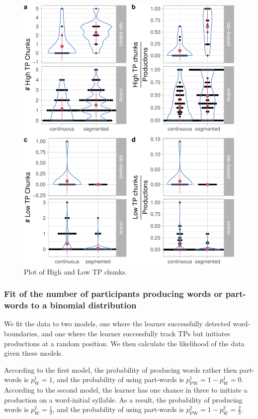 \documentclass[
]{article}
\begin{document}
\begin{figure}

{\centering \includegraphics[width=0.8\linewidth]{segmentation_recall_combined_for_revision3_files/figure-latex/recall-tp-chunks-raw-plot-1} 

}

\caption{Plot of High and Low TP chunks.}\label{fig:recall-tp-chunks-raw-plot}
\end{figure}

\clearpage

\subsubsection{Fit of the number of participants producing words or
part-words to a binomial
distribution}\label{fit-of-the-number-of-participants-producing-words-or-part-words-to-a-binomial-distribution}

We fit the data to two models, one where the learner successfully
detected word-boundaries, and one where the learner successfully track
TPs but initiates productions at a random position. We then calculate
the likelihood of the data given these models.

According to the first model, the probability of producing words rather
then part-words is \(p^1_{\text{W}} = 1\), and the probability of using
part-words is \(p^1_{\text{PW}} = 1 - p^1_{\text{W}} = 0\). According to
the second model, the learner has one chance in three to initiate a
production on a word-initial syllable. As a result, the probability of
producing words is \(p^2_{\text{W}} = \frac{1}{3}\), and the probability
of using part-words is
\(p^2_{\text{PW}} = 1 - p^2_{\text{W}} = \frac{2}{3}\).
\end{document}
